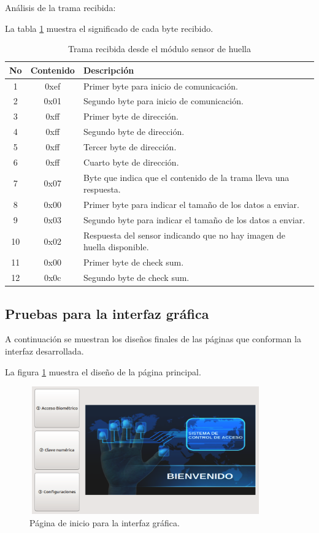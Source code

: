 Análisis de la trama recibida:

La tabla \ref{tab:tramarecibida} muestra el significado de cada byte recibido.

\begin{table}[h]
	\centering
	\caption[Resultado de la trama recibida]{Trama recibida desde el módulo sensor de huella}
	\begin{tabular}{c c l}    
		\toprule
		\textbf{No}  & \textbf{Contenido}  & \textbf{Descripción}\\
		\midrule
		1	 	& 0xef 	& Primer byte para inicio de comunicación.\\		
		2	 	& 0x01 	& Segundo byte para inicio de comunicación.\\
		3 		& 0xff & Primer byte de dirección.\\	
		4	 	& 0xff 	& Segundo byte de dirección.\\
		5	 	& 0xff 	& Tercer byte de dirección.\\
		6	 	& 0xff 	& Cuarto byte de dirección.\\
		7	 	& 0x07 	& Byte que indica que el contenido de la trama lleva una respuesta.\\
		8	 	& 0x00 	& Primer byte para indicar el tamaño de los datos a enviar.\\				
		9	 	& 0x03 	& Segundo byte para indicar el tamaño de los datos a enviar.\\	
		10	 	& 0x02 	& Respuesta del sensor indicando que no hay imagen de huella disponible.\\	
		11	 	& 0x00 	& Primer byte de check sum.\\	
		12	 	& 0x0c 	& Segundo byte de check sum.\\				
		\bottomrule
		\hline
	\end{tabular}
	\label{tab:tramarecibida}
\end{table}

\subsection{Pruebas para la interfaz gráfica}
A continuación se muestran los diseños finales de las páginas que conforman la interfaz desarrollada.




La figura \ref{fig:paginicio} muestra el diseño de la página principal.
\begin{figure}[h]
	\centering
	\includegraphics[height=5.5cm,width=10cm]{./Figures/paginicio.png}
	\caption{Página de inicio para la interfaz gráfica.}
	\label{fig:paginicio}
\end{figure}



